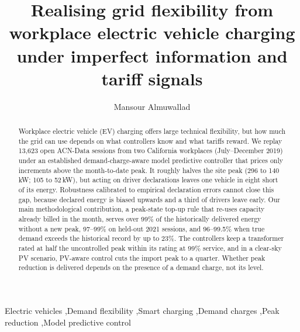 \documentclass[preprint,11pt]{elsarticle}
\begin{document}
\begin{frontmatter}

\title{Realising grid flexibility from workplace electric vehicle charging under imperfect information and tariff signals}

\author[inst]{Mansour Almuwallad}

\begin{abstract}
Workplace electric vehicle (EV) charging offers large technical flexibility, but how much the grid can use depends on what controllers know and what tariffs reward. We replay 13,623 open ACN-Data sessions from two California workplaces (July--December 2019) under an established demand-charge-aware model predictive controller that prices only increments above the month-to-date peak. It roughly halves the site peak (296 to 140\,kW; 105 to 52\,kW), but acting on driver declarations leaves one vehicle in eight short of its energy. Robustness calibrated to empirical declaration errors cannot close this gap, because declared energy is biased upwards and a third of drivers leave early. Our main methodological contribution, a peak-state top-up rule that re-uses capacity already billed in the month, serves over 99\% of the historically delivered energy without a new peak, 97--99\% on held-out 2021 sessions, and 96--99.5\% when true demand exceeds the historical record by up to 23\%. The controllers keep a transformer rated at half the uncontrolled peak within its rating at 99\% service, and in a clear-sky PV scenario, PV-aware control cuts the import peak to a quarter. Whether peak reduction is delivered depends on the presence of a demand charge, not its level.
\end{abstract}

\begin{keyword}
Electric vehicles \sep Demand flexibility \sep Smart charging \sep Demand charges \sep Peak reduction \sep Model predictive control
\end{keyword}

\end{frontmatter}

\linenumbers



\end{document}
